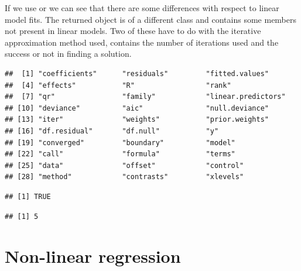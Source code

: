 \documentclass[krantz2]{krantz}\usepackage{knitr}
\begin{document}
\begin{explainbox}
If we use  or  we can see that there are some differences with respect to linear model fits. The returned object is of a different class and contains some members not present in linear models. Two of these have to do with the iterative approximation method used,  contains the number of iterations used  and  the success or not in finding a solution.

\begin{knitrout}\footnotesize
{}\color{fgcolor}\begin{kframe}
\begin{alltt}
\end{alltt}
\begin{verbatim}
##  [1] "coefficients"      "residuals"         "fitted.values"
##  [4] "effects"           "R"                 "rank"
##  [7] "qr"                "family"            "linear.predictors"
## [10] "deviance"          "aic"               "null.deviance"
## [13] "iter"              "weights"           "prior.weights"
## [16] "df.residual"       "df.null"           "y"
## [19] "converged"         "boundary"          "model"
## [22] "call"              "formula"           "terms"
## [25] "data"              "offset"            "control"
## [28] "method"            "contrasts"         "xlevels"
\end{verbatim}
\begin{alltt}
\hlopt{$}
\end{alltt}
\begin{verbatim}
## [1] TRUE
\end{verbatim}
\begin{alltt}
\hlopt{$}
\end{alltt}
\begin{verbatim}
## [1] 5
\end{verbatim}
\end{kframe}
\end{knitrout}
\end{explainbox}


\section{Non-linear regression}\label{sec:stat:NLS}
%
%
\end{document}
